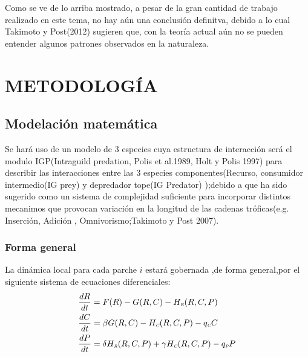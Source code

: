 \documentclass[a4paper,11pt]{article}
\newcommand{\C}{\textit{\tiny C}}
\newcommand{\R}{\textit{\tiny R}}
\begin{document}
Como se ve de lo arriba mostrado, a pesar de la gran cantidad de trabajo realizado en este tema, no hay a\'un una conclusi\'on definitva, debido a lo cual Takimoto y Post(2012) sugieren que, con la teor\'ia actual a\'un no se pueden entender algunos patrones observados en la naturaleza.
\section{METODOLOG\'IA}
\subsection{Modelaci\'on matem\'atica}
Se har\'a uso de un modelo de 3 especies cuya estructura de interacci\'on ser\'a  el modulo IGP(Intraguild predation, Polis et al.1989, Holt y Polis 1997) para describir las interacciones entre las 3 especies componentes(Recurso, consumidor intermedio(IG prey) y depredador tope(IG Predator) );debido a que ha sido sugerido como un sistema de complejidad suficiente para incorporar distintos mecanimos que provocan variaci\'on en la longitud de las cadenas tr\'oficas(e.g. Inserci\'on, Adici\'on , Omnivorismo;Takimoto y Post 2007).
\subsubsection*{Forma general}
La din\'amica local para cada parche $i$ estar\'a gobernada ,de forma general,por el siguiente sistema de ecuaciones diferenciales:
\begin{align}
&\frac{dR}{dt} = F(R) -G(R,C)-H_{\R}(R,C,P)  \\
&\frac{dC}{dt} = \beta G(R,C)-H_{\C}(R,C,P) - q_{\C}C  \\
&\frac{dP}{dt} = \delta H_{\R}(R,C,P) +\gamma H_{\C}(R,C,P) -q_{\textit{\tiny P}}P
\end{align}
\end{document}
